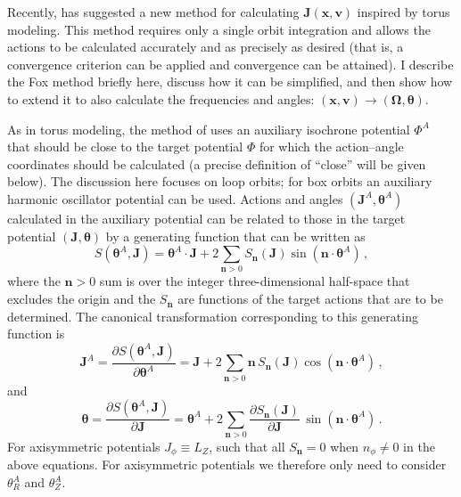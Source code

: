 \documentclass{emulateapj}
\renewcommand{\vec}[1]{\ensuremath{\mathbf{#1}}}
\newcommand{\vecx}{\ensuremath{\vec{x}}}
\newcommand{\vecv}{\ensuremath{\vec{v}}}
\newcommand{\vecj}{\ensuremath{\vec{J}}}
\newcommand{\vecn}{\ensuremath{\vec{n}}}
\newcommand{\veco}{\ensuremath{\vec{\Omega}}}
\newcommand{\veca}{\ensuremath{\boldsymbol\theta}}
\begin{document}
Recently, \citet{Fox12a} has suggested a new method for calculating
$\vecj(\vecx,\vecv)$ inspired by torus modeling. This method requires
only a single orbit integration and allows the actions to be
calculated accurately and as precisely as desired (that is, a
convergence criterion can be applied and convergence can be
attained). I describe the Fox method briefly here, discuss how it can
be simplified, and then show how to extend it to also calculate the
frequencies and angles: $(\vecx,\vecv) \rightarrow (\veco,\veca)$.

As in torus modeling, the method of \citet{Fox12a} uses an auxiliary
isochrone potential $\Phi^A$ that should be close to the target
potential $\Phi$ for which the action--angle coordinates should be
calculated (a precise definition of ``close'' will be given
below). The discussion here focuses on loop orbits; for box orbits an
auxiliary harmonic oscillator potential can be used. Actions and
angles $(\vecj^A,\veca^A)$ calculated in the auxiliary potential can
be related to those in the target potential $(\vecj,\veca)$ by a
generating function that can be written as \citep{McGill90a}
\begin{equation}
  S(\veca^A,\vecj) = \veca^A\cdot\vecj+2\sum_{\vecn > 0} S_{\vecn}(\vecj)\sin(\vecn\cdot\veca^A)\,,
\end{equation}
where the $\vecn > 0$ sum is over the integer three-dimensional
half-space that excludes the origin and the $S_{\vecn}$ are functions
of the target actions that are to be determined. The canonical
transformation corresponding to this generating function is
\begin{equation}\label{eq:jjt}
  \vecj^A = \frac{\partial S(\veca^A,\vecj)}{\partial \veca^A} = \vecj + 2\sum_{\vecn > 0} \vecn\,S_{\vecn}(\vecj)\cos(\vecn\cdot\veca^A)\,,
\end{equation}
and
\begin{equation}\label{eq:aat}
  \veca = \frac{\partial S(\veca^A,\vecj)}{\partial \vecj} = \veca^A +2\sum_{\vecn > 0} \frac{\partial S_{\vecn}(\vecj)}{\partial \vecj}\,\sin(\vecn\cdot\veca^A)\,.
\end{equation}
For axisymmetric potentials $J_\phi \equiv L_Z$, such that all
$S_\vecn = 0$ when $n_\phi \neq 0 $ in the above equations. For
axisymmetric potentials we therefore only need to consider
$\theta^A_R$ and $\theta^A_Z$.
\end{document}

